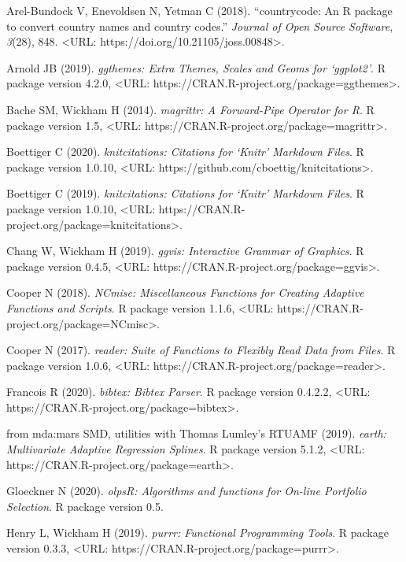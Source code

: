 \documentclass{puthesis}
\begin{document}
Arel-Bundock V, Enevoldsen N, Yetman C (2018). ``countrycode: An R
package to convert country names and country codes.'' \emph{Journal of
Open Source Software}, \emph{3}(28), 848. \textless URL:
https://doi.org/10.21105/joss.00848\textgreater.

Arnold JB (2019). \emph{ggthemes: Extra Themes, Scales and Geoms for
`ggplot2'}. R package version 4.2.0, \textless URL:
https://CRAN.R-project.org/package=ggthemes\textgreater.

Bache SM, Wickham H (2014). \emph{magrittr: A Forward-Pipe Operator for
R}. R package version 1.5, \textless URL:
https://CRAN.R-project.org/package=magrittr\textgreater.

Boettiger C (2020). \emph{knitcitations: Citations for `Knitr' Markdown
Files}. R package version 1.0.10, \textless URL:
https://github.com/cboettig/knitcitations\textgreater.

Boettiger C (2019). \emph{knitcitations: Citations for `Knitr' Markdown
Files}. R package version 1.0.10, \textless URL:
https://CRAN.R-project.org/package=knitcitations\textgreater.

Chang W, Wickham H (2019). \emph{ggvis: Interactive Grammar of
Graphics}. R package version 0.4.5, \textless URL:
https://CRAN.R-project.org/package=ggvis\textgreater.

Cooper N (2018). \emph{NCmisc: Miscellaneous Functions for Creating
Adaptive Functions and Scripts}. R package version 1.1.6, \textless URL:
https://CRAN.R-project.org/package=NCmisc\textgreater.

Cooper N (2017). \emph{reader: Suite of Functions to Flexibly Read Data
from Files}. R package version 1.0.6, \textless URL:
https://CRAN.R-project.org/package=reader\textgreater.

Francois R (2020). \emph{bibtex: Bibtex Parser}. R package version
0.4.2.2, \textless URL:
https://CRAN.R-project.org/package=bibtex\textgreater.

from mda:mars SMD, utilities with Thomas Lumley's RTUAMF (2019).
\emph{earth: Multivariate Adaptive Regression Splines}. R package
version 5.1.2, \textless URL:
https://CRAN.R-project.org/package=earth\textgreater.

Gloeckner N (2020). \emph{olpsR: Algorithms and functions for On-line
Portfolio Selection}. R package version 0.5.

Henry L, Wickham H (2019). \emph{purrr: Functional Programming Tools}. R
package version 0.3.3, \textless URL:
https://CRAN.R-project.org/package=purrr\textgreater.
\end{document}
